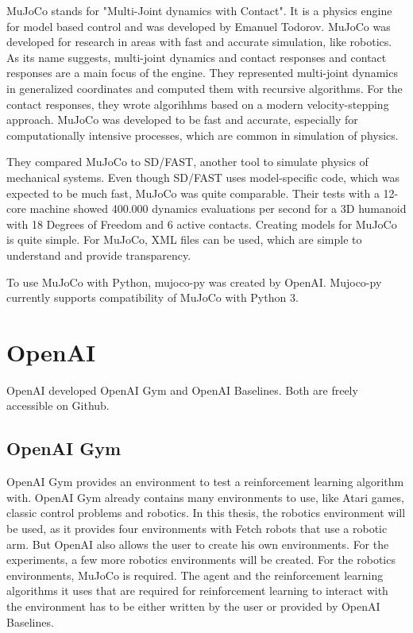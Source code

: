 MuJoCo stands for "Multi-Joint dynamics with Contact". It is a physics engine for model based control and was developed by Emanuel Todorov.
MuJoCo was developed for research in areas with fast and accurate simulation, like robotics. As its name suggests, multi-joint dynamics and contact responses and contact responses are a main focus of the engine. They represented multi-joint dynamics in generalized coordinates and computed them with recursive algorithms. For the contact responses, they wrote algorihhms based on a modern velocity-stepping approach. MuJoCo was developed to be fast and accurate, especially for computationally intensive processes, which are common in simulation of physics. 

\vspace{0.5cm}

They compared MuJoCo to SD/FAST, another tool to simulate physics of mechanical systems. Even though SD/FAST uses model-specific code, which was expected to be much fast, MuJoCo was quite comparable. Their tests with a 12-core machine showed 400.000 dynamics evaluations per second for a 3D humanoid with 18 Degrees of Freedom and 6 active contacts. 
Creating models for MuJoCo is quite simple. For MuJoCo, XML files can be used, which are simple to understand and provide transparency. 

\vspace{0.5cm}

To use MuJoCo with Python, mujoco-py was created by OpenAI. Mujoco-py currently supports compatibility of MuJoCo with Python 3.



\section{OpenAI}

OpenAI developed OpenAI Gym and OpenAI Baselines. Both are freely accessible on Github.


\subsection{OpenAI Gym}

OpenAI Gym provides an environment to test a reinforcement learning algorithm with. OpenAI Gym already contains many environments to use, like Atari games, classic control problems and robotics. In this thesis, the robotics environment will be used, as it provides four environments with Fetch robots that use a robotic arm. But OpenAI also allows the user to create his own environments. For the experiments, a few more robotics environments will be created. For the robotics environments, MuJoCo is required. 
The agent and the reinforcement learning algorithms it uses that are required for reinforcement learning to interact with the environment has to be either written by the user or provided by OpenAI Baselines.

